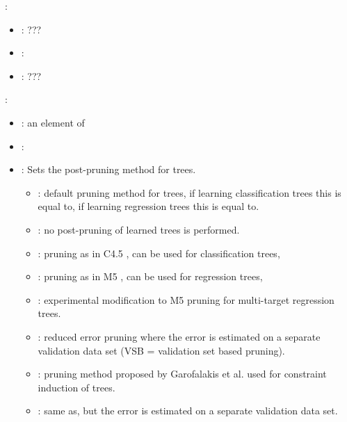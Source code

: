 \begin{itemize}
{    \item {}:
           \begin{itemize}
                \item \optionPossibleValues{}: ???
                \item \optionDefaultValue{}: 
                \item \optionDescrption{}: ???
           \end{itemize}
    }
    \item {}:
           \begin{itemize}
                \item \optionPossibleValues{}: an element of 
                \item \optionDefaultValue{}: 
                \item \optionDescrption{}: Sets the post-pruning method for trees.
                \begin{itemize}
                    \item{}: default pruning method for trees, if learning classification trees this is equal to, if learning regression trees this is equal to. %
                    \item{}: no post-pruning of learned trees is performed.
                    \item{}: pruning as in C4.5 \cite{Quinlan1993}, can be used for classification trees,
                    \item{}: pruning as in M5 \cite{Quinlan1992},	can be used for regression trees,
                    \item{}: experimental modification to M5 \cite{Quinlan1992} pruning for multi-target regression trees.
                    \item{}: reduced error pruning where the error is estimated on a separate validation data set (VSB = validation set based pruning).
                    \item{}: pruning method proposed by Garofalakis et al. \cite{Garofalakis03:jrnl} used for constraint induction of trees.
                    \item{}: same as, but the error is estimated on a separate validation data set.

\end{itemize}
\end{itemize}
\end{itemize}

